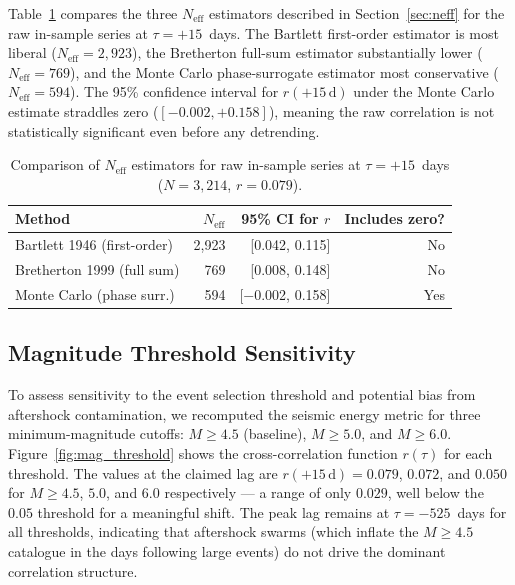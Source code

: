 \documentclass[12pt,a4paper]{article}
\begin{document}
Table~\ref{tab:neff} compares the three $N_\text{eff}$ estimators described
in Section~\ref{sec:neff} for the raw in-sample series at $\tau = +15$~days.
The Bartlett first-order estimator is most liberal ($N_\text{eff} = 2{,}923$),
the Bretherton full-sum estimator substantially lower ($N_\text{eff} = 769$),
and the Monte Carlo phase-surrogate estimator most conservative
($N_\text{eff} = 594$).
The 95\% confidence interval for $r(+15\,\text{d})$ under the Monte Carlo
estimate straddles zero ($[-0.002, +0.158]$), meaning the raw correlation is
not statistically significant even before any detrending.

\begin{table}[htbp]
  \centering
  \caption{Comparison of $N_\text{eff}$ estimators for raw in-sample series at
  $\tau = +15$~days ($N = 3{,}214$, $r = 0.079$).}
  \label{tab:neff}
  \begin{tabular}{lrrr}
    \toprule
    Method & $N_\text{eff}$ & 95\% CI for $r$ & Includes zero? \\
    \midrule
    Bartlett 1946 (first-order) & 2{,}923 & [0.042, 0.115] & No \\
    Bretherton 1999 (full sum)  &   769 & [0.008, 0.148] & No \\
    Monte Carlo (phase surr.)   &   594 & [$-$0.002, 0.158] & Yes \\
    \bottomrule
  \end{tabular}
\end{table}

\subsection{Magnitude Threshold Sensitivity}
\label{sec:mag_threshold}

To assess sensitivity to the event selection threshold and potential bias from
aftershock contamination, we recomputed the seismic energy metric for three
minimum-magnitude cutoffs: $M \geq 4.5$ (baseline), $M \geq 5.0$, and
$M \geq 6.0$.
Figure~\ref{fig:mag_threshold} shows the cross-correlation function $r(\tau)$
for each threshold.
The values at the claimed lag are $r(+15\,\text{d}) = 0.079$, $0.072$, and
$0.050$ for $M \geq 4.5$, $5.0$, and $6.0$ respectively --- a range of only
$0.029$, well below the $0.05$ threshold for a meaningful shift.
The peak lag remains at $\tau = -525$~days for all thresholds, indicating
that aftershock swarms (which inflate the $M \geq 4.5$ catalogue in the days
following large events) do not drive the dominant correlation structure.
\end{document}
